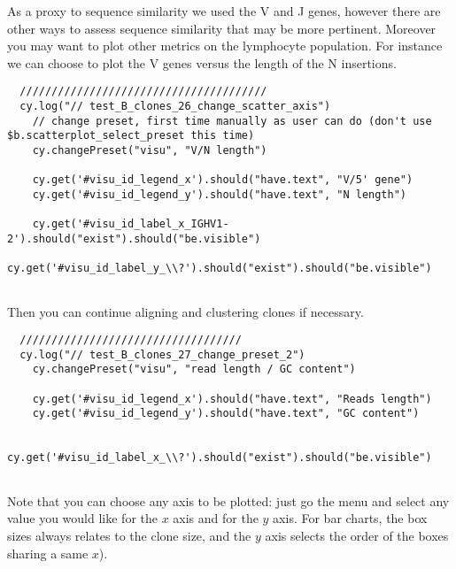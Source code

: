 As a proxy to sequence similarity we used the V and J genes, however there are
other ways to assess sequence similarity that may be more pertinent.
Moreover you may want to plot other metrics on the lymphocyte population.
%
For instance we can choose to plot the V genes versus the length of the N
insertions.
\begin{verbatim}
  ///////////////////////////////////////
  cy.log("// test_B_clones_26_change_scatter_axis")
    // change preset, first time manually as user can do (don't use $b.scatterplot_select_preset this time)
    cy.changePreset("visu", "V/N length")

    cy.get('#visu_id_legend_x').should("have.text", "V/5' gene")
    cy.get('#visu_id_legend_y').should("have.text", "N length")

    cy.get('#visu_id_label_x_IGHV1-2').should("exist").should("be.visible")
    cy.get('#visu_id_label_y_\\?').should("exist").should("be.visible")


\end{verbatim}

Then you can continue aligning and clustering clones if necessary.

\begin{verbatim}
  ///////////////////////////////////
  cy.log("// test_B_clones_27_change_preset_2")
    cy.changePreset("visu", "read length / GC content")

    cy.get('#visu_id_legend_x').should("have.text", "Reads length")
    cy.get('#visu_id_legend_y').should("have.text", "GC content")

    cy.get('#visu_id_label_x_\\?').should("exist").should("be.visible")


\end{verbatim}

Note that you can choose any axis to be plotted: just go the  menu and
select any value you would like for the $x$ axis and for the $y$ axis.
For bar charts, the box sizes always relates to the clone size,
and the $y$ axis selects the order of the boxes sharing a same $x$).


